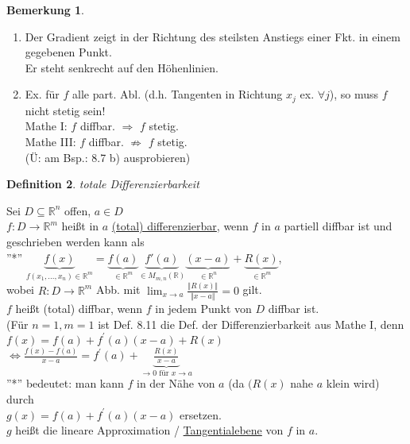 \documentclass[a4paper,11pt]{article}
\newtheorem{definition}{Definition}[section]
\newtheorem{bem}[definition]{Bemerkung}
\begin{document}
\begin{bem}
\end{bem}
\begin{enumerate}[label=\alph*)]
	\item Der Gradient zeigt in der Richtung des steilsten Anstiegs einer Fkt. in einem gegebenen Punkt. \\
	Er steht senkrecht auf den Höhenlinien.
	\item Ex. für $f$ alle part. Abl. (d.h. Tangenten in Richtung $x_j$ ex. $\forall j$), so muss $f$ nicht stetig sein! \\
	Mathe I: $f$ diffbar. $\Rightarrow$ $f$ stetig. \\
	Mathe III: $f$ diffbar. $\not\Rightarrow$ $f$ stetig. \\
	(Ü: am Bsp.: 8.7 b) ausprobieren)
\end{enumerate}

\newpage

\begin{definition}
	totale Differenzierbarkeit
\end{definition}
Sei $D\subseteq\mathbb{R}^n$ offen, $a\in D$ \\
$f\colon D\to\mathbb{R}^m$ heißt in $a$ \underline{(total) differenzierbar}, wenn $f$ in $a$ partiell diffbar ist und geschrieben werden kann als \\
''*'' $\underbrace{f(x)}_{f(x_1,...,x_n)\in\mathbb{R}^m}=\underbrace{f(a)}_{\in\mathbb{R}^m}\underbrace{f\prime(a)}_{\in M_{m,n}(\mathbb{R})}\underbrace{(x-a)}_{\in\mathbb{R}^n}+\underbrace{R(x)}_{\in\mathbb{R}^m}$, \\
wobei $R\colon D\to\mathbb{R}^m$ Abb. mit $\lim_{x\to a}\frac{\Vert R(x)\Vert}{\Vert x-a\Vert}=0$ gilt. \\
$f$ heißt (total) diffbar, wenn $f$ in jedem Punkt von $D$ diffbar ist. \\
(Für $n=1,m=1$ ist Def. 8.11 die Def. der Differenzierbarkeit aus Mathe I, denn \\
$f(x)=f(a)+f^\prime(a)(x-a)+R(x)$ \\
$\Leftrightarrow\frac{f(x)-f(a)}{x-a}=f^\prime(a)+\underbrace{\frac{R(x)}{x-a}}_{\to0\text{ für }x\to a}$ \\
''*'' bedeutet: man kann $f$ in der Nähe von $a$ (da $(R(x)$ nahe $a$ klein wird) durch \\
$g(x)=f(a)+f^\prime(a)(x-a)$ ersetzen. \\
$g$ heißt die lineare Approximation / \underline{Tangentialebene} von $f$ in $a$.
\end{document}
